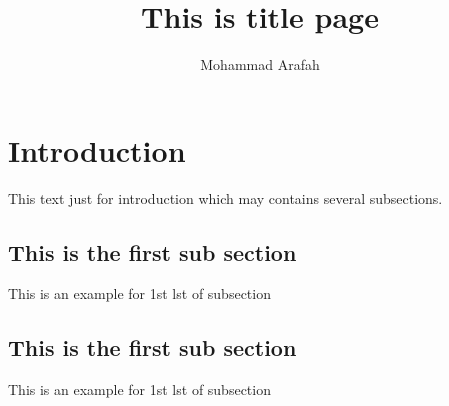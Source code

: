 \documentclass{article} %
\title{This is title page}
\author{Mohammad Arafah}
\begin{document}
\maketitle
\section{Introduction}
This text just for introduction which may contains several subsections.
\subsection{This is the first sub section}
This is an example for 1st lst of subsection

\subsection{This is the first sub section}
This is an example for 1st lst of subsection
\end{document}
